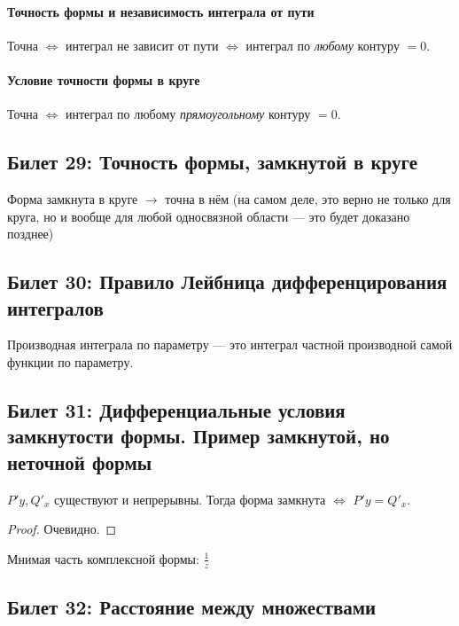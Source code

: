 \documentclass[12pt, a4paper, oneside]{memoir}
\begin{document}
\paragraph{Точность формы и независимость интеграла от пути}
Точна $\Leftrightarrow$ интеграл не зависит от пути $\Leftrightarrow$ интеграл по \textit{любому} контуру $= 0$.


\paragraph{Условие точности формы в круге} 
Точна $\Leftrightarrow$ интеграл по любому \textit{прямоугольному} контуру $= 0$.


\subsection{Билет 29: Точность формы, замкнутой в круге} Форма замкнута в круге $→$ точна в нём 
(на самом деле, это верно не только для круга, 
но и вообще для любой односвязной области — это будет доказано позднее)



\subsection{Билет 30: Правило Лейбница дифференцирования интегралов}
Производная интеграла по параметру 
— это интеграл частной производной самой функции по параметру.


\subsection{Билет 31: Дифференциальные условия замкнутости формы. Пример замкнутой, но неточной формы}

\begin{theorem} 
    $P'y, Q'_x$ существуют и непрерывны. Тогда форма замкнута $\Leftrightarrow$ $P'y = Q'_x$.

    \begin{proof}
        Очевидно.
    \end{proof}
\end{theorem}

\begin{example}
    Мнимая часть комплексной формы: $\frac{1}{z}$
\end{example}
\subsection{Билет 32: Расстояние между множествами}
\end{document}
